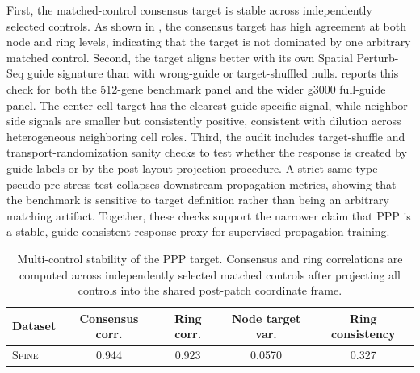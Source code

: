 \documentclass[sigconf,anonymous,review]{acmart}
\newcommand{\methodname}{\textsc{Spine}\xspace}
\begin{document}
First, the matched-control consensus target is stable across independently selected controls. As shown in , the consensus target has high agreement at both node and ring levels, indicating that the target is not dominated by one arbitrary matched control. Second, the target aligns better with its own Spatial Perturb-Seq guide signature than with wrong-guide or target-shuffled nulls.  reports this check for both the 512-gene benchmark panel and the wider g3000 full-guide panel. The center-cell target has the clearest guide-specific signal, while neighbor-side signals are smaller but consistently positive, consistent with dilution across heterogeneous neighboring cell roles. Third, the audit includes target-shuffle and transport-randomization sanity checks to test whether the response is created by guide labels or by the post-layout projection procedure. A strict same-type pseudo-pre stress test collapses downstream propagation metrics, showing that the benchmark is sensitive to target definition rather than being an arbitrary matching artifact. Together, these checks support the narrower claim that PPP is a stable, guide-consistent response proxy for supervised propagation training.

\begin{table}[t]
\centering
\footnotesize
\setlength{\tabcolsep}{6pt}
\renewcommand{\arraystretch}{1.05}
\caption{Multi-control stability of the PPP target. Consensus and ring correlations are computed across independently selected matched controls after projecting all controls into the shared post-patch coordinate frame.}
\label{tab:app_ppp_control_stability}
\begin{tabular}{lcccc}
\toprule
\textbf{Dataset} & \textbf{Consensus corr.} & \textbf{Ring corr.} & \textbf{Node target var.} & \textbf{Ring consistency} \\
\midrule
\methodname{} & 0.944 & 0.923 & 0.0570 & 0.327 \\
\bottomrule
\end{tabular}
\end{table}
\end{document}
